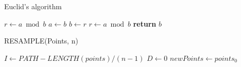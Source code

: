 \begin{algorithm}
  \caption{Euclid’s algorithm}\label{euclid}
  \begin{algorithmic}[1]
    \State $r\gets a\bmod b$
     \label{marker}
      \State $a\gets b$
      \State $b\gets r$
      \State $r\gets a\bmod b$
    \EndWhile
    \State \textbf{return} $b$
  \EndProcedure
\end{algorithmic}
\end{algorithm}

\begin{algorithm}
  \caption*{RESAMPLE(Points, n)}
  \begin{algorithmic}[1]
  \State $I \gets PATH-LENGTH(points) / (n - 1)$
  \State $D \gets 0$
  \State $newPoints \gets points_\textit{0}$
  
\end{algorithmic}
\end{algorithm}






